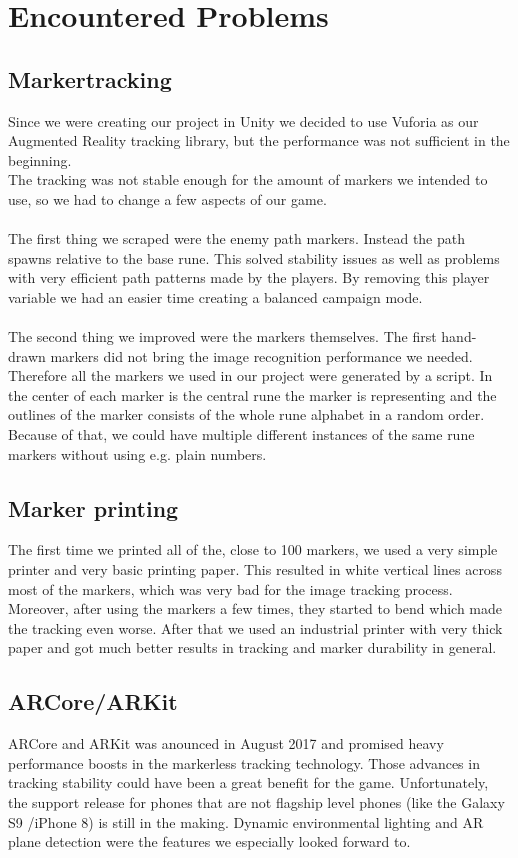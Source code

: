 \section{Encountered Problems}
\label{sec:problems}

\subsection{Markertracking}

Since we were creating our project in Unity we decided to use Vuforia as our Augmented Reality tracking library, but the performance was not sufficient in the beginning.\\
The tracking was not stable enough for the amount of markers we intended to use, so we had to change a few aspects of our game.\\\\
The first thing we scraped were the enemy path markers. Instead the path spawns relative to the base rune. This solved stability issues as well as problems with very efficient path patterns made by the players.
By removing this player variable we had an easier time creating a balanced campaign mode.\\\\
The second thing we improved were the markers themselves. The first hand-drawn markers did not bring the image recognition performance we needed.\\
Therefore all the markers we used in our project were generated by a script. In the center of each marker is the central rune the marker is representing and the outlines of the marker consists of the whole rune alphabet in a random order.
Because of that, we could have multiple different instances of the same rune markers without using e.g. plain numbers.\\

\subsection{Marker printing}

The first time we printed all of the, close to 100 markers, we used a very simple printer and very basic printing paper.
This resulted in white vertical lines across most of the markers, which was very bad for the image tracking process. 
Moreover, after using the markers a few times, they started to bend which made the tracking even worse.
After that we used an industrial printer with very thick paper and got much better results in tracking and marker durability in general.

\subsection{ARCore/ARKit}

ARCore and ARKit was anounced in August 2017 and promised heavy performance boosts in the markerless tracking technology. Those advances in tracking stability could have been a great benefit for 
the game. Unfortunately, the support release for phones that are not flagship level phones (like the Galaxy S9 /iPhone 8) is still in the making. Dynamic environmental lighting and AR plane detection
were the features we especially looked forward to.

